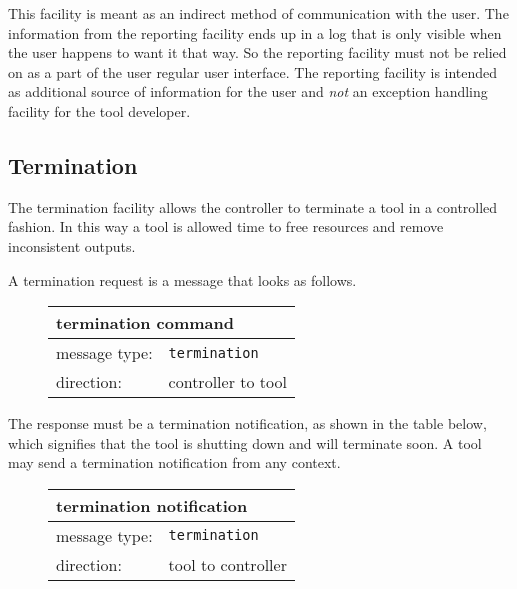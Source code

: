\documentclass{article}
\newcommand{\msg}[1]{\texttt{#1}}
\begin{document}
   \noindent This facility is meant as an indirect method of communication with
   the user. The information from the reporting facility ends up in a log that
   is only visible when the user happens to want it that way. So the reporting
   facility must not be relied on as a part of the user regular user interface.
   The reporting facility is intended as additional source of information for
   the user and \emph{not} an exception handling facility for the tool
   developer.

  \subsection{Termination}

   The termination facility allows the controller to terminate a tool in a
   controlled fashion.  In this way a tool is allowed time to free resources
   and remove inconsistent outputs.
   
   \noindent A termination request is a message that looks as follows.

   \begin{figure}[H]
    \begin{center}
     \begin{tabular}{|ll|}
      \hline
       \multicolumn{2}{|l|}{\textbf{termination command}} \\
      \hline
       message type:    & \msg{termination} \\
      \hline
       direction:       & controller to tool \\
      \hline
     \end{tabular}
    \end{center}
   \end{figure}
   \vspace{-0.5cm}

   \noindent The response must be a termination notification, as shown in the
   table below, which signifies that the tool is shutting down and will
   terminate soon. A tool may send a termination notification from any context.

   \begin{figure}[H]
    \begin{center}
     \begin{tabular}{|ll|}
      \hline
       \multicolumn{2}{|l|}{\textbf{termination notification}} \\
      \hline
       message type:   & \msg{termination} \\
      \hline
       direction:      & tool to controller \\
      \hline
     \end{tabular}
    \end{center}
   \end{figure}
   \vspace{-0.5cm}
\end{document}
